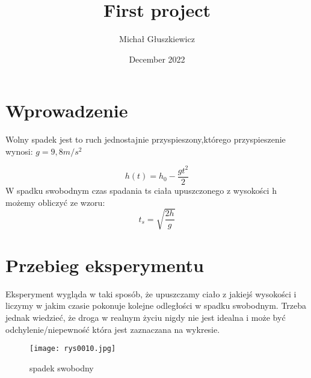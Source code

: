\documentclass{article}
\title{First project}
\author{Michał Głuszkiewicz}
\date{December 2022}
\begin{document}
\maketitle
\section{Wprowadzenie}
\begin{center}
Wolny spadek jest to ruch jednostajnie przyspieszony,którego przyspieszenie wynosi: $g = 9,8m/s^2$
\end{center}
\begin{equation}
h(t)=h_0 - \frac{gt^2}{2}
\end{equation}
W spadku swobodnym czas spadania ts ciała upuszczonego z wysokości h możemy obliczyć ze wzoru:
\begin{equation}
    t_s= \sqrt{\frac{2h}{g}}
\end{equation}
\section{Przebieg eksperymentu}
Eksperyment wygląda w taki sposób, że upuszczamy ciało z jakiejś wysokości i liczymy w jakim czasie pokonuje kolejne odległości w spadku swobodnym. Trzeba jednak wiedzieć, że droga w realnym życiu nigdy nie jest idealna i może być odchylenie/niepewność która jest zaznaczana na wykresie.

\begin{figure}[h]
\texttt{[image: rys0010.jpg]}
\label{fig:schemat doswiadczenia}
\caption{spadek swobodny}
\end{figure}
\end{document}
